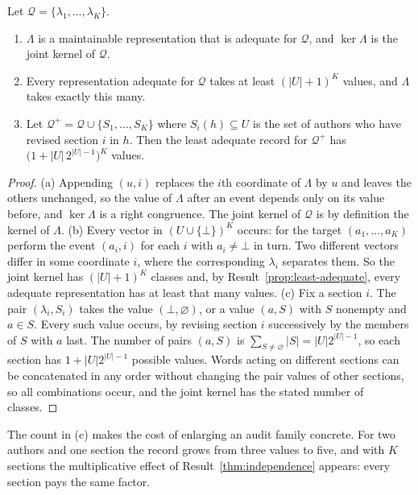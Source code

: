 \begin{newresult}\label{thm:last-author}
Let $\mathcal Q=\{\lambda_1,\dots,\lambda_K\}$.
\begin{enumerate}[nosep,label=(\alph*)]
  \item $\Lambda$ is a maintainable representation that is adequate for $\mathcal Q$, and $\ker\Lambda$ is the joint kernel of $\mathcal Q$.
  \item Every representation adequate for $\mathcal Q$ takes at least $(|U|+1)^{K}$ values, and $\Lambda$ takes exactly this many.
  \item Let $\mathcal Q^{+}=\mathcal Q\cup\{S_1,\dots,S_K\}$ where $S_i(h)\subseteq U$ is the set of authors who have revised section $i$ in $h$. Then the least adequate record for $\mathcal Q^{+}$ has $\bigl(1+|U|\,2^{|U|-1}\bigr)^{K}$ values.
\end{enumerate}
\end{newresult}
\begin{proof}
(a) Appending $(u,i)$ replaces the $i$th coordinate of $\Lambda$ by $u$ and leaves the others unchanged, so the value of $\Lambda$ after an event depends only on its value before, and $\ker\Lambda$ is a right congruence. The joint kernel of $\mathcal Q$ is by definition the kernel of $\Lambda$. (b) Every vector in $(U\cup\{\bot\})^{K}$ occurs: for the target $(a_1,\dots,a_K)$ perform the event $(a_i,i)$ for each $i$ with $a_i\ne\bot$ in turn. Two different vectors differ in some coordinate $i$, where the corresponding $\lambda_i$ separates them. So the joint kernel has $(|U|+1)^{K}$ classes and, by Result~\ref{prop:least-adequate}, every adequate representation has at least that many values. (c) Fix a section $i$. The pair $(\lambda_i,S_i)$ takes the value $(\bot,\varnothing)$, or a value $(a,S)$ with $S$ nonempty and $a\in S$. Every such value occurs, by revising section $i$ successively by the members of $S$ with $a$ last. The number of pairs $(a,S)$ is $\sum_{S\ne\varnothing}|S|=|U|2^{|U|-1}$, so each section has $1+|U|2^{|U|-1}$ possible values. Words acting on different sections can be concatenated in any order without changing the pair values of other sections, so all combinations occur, and the joint kernel has the stated number of classes.
\end{proof}

The count in (c) makes the cost of enlarging an audit family concrete. For two authors and one section the record grows from three values to five, and with $K$ sections the multiplicative effect of Result~\ref{thm:independence} appears: every section pays the same factor.

